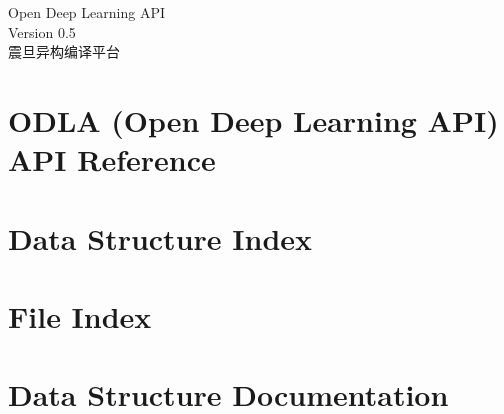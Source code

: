 \documentclass[twoside]{book}
\newcommand{\+}{\discretionary{\mbox{\scriptsize$\hookleftarrow$}}{}{}}
\newcommand{\clearemptydoublepage}{%
  \newpage{\pagestyle{empty}\cleardoublepage}%
}
\begin{document}
\hypersetup{pageanchor=false,
             bookmarksnumbered=true,
             pdfencoding=unicode
            }
\begin{titlepage}
\vspace*{7cm}
\begin{center}%
{\Large Open Deep Learning API}\\
\vspace*{1cm}
{\large Version 0.5}\\
\vspace*{2cm}
{\large 震旦异构编译平台} \\
\end{center}
\end{titlepage}
\clearemptydoublepage
{}
\tableofcontents
\clearemptydoublepage
{}
\hypersetup{pageanchor=true}
\chapter{ODLA (Open Deep Learning API) API Reference}
\label{index}\hypertarget{index}{}
\chapter{Data Structure Index}

\chapter{File Index}

\chapter{Data Structure Documentation}






\end{document}
